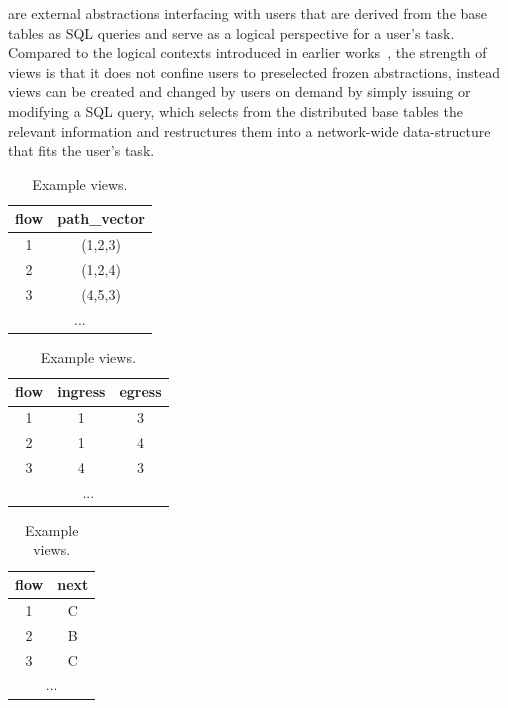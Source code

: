  are external
abstractions interfacing with users that are derived from the base tables as SQL
queries and serve as a logical perspective for a user's task. Compared to the
logical contexts introduced in earlier
works~\cite{ethane-sigcomm07,virtual-forwarding-plane}, the strength
of \Sys views is that it does not confine users to preselected
frozen abstractions, instead \Sys views can be created and changed by
users on demand by simply issuing or modifying a SQL query,
which selects from the distributed base tables the relevant
information and restructures them into a network-wide data-structure
that fits the user's task.

\begin{table}[ht!]
  \centering
\begin{subtable}[t]{0.3\linewidth}
    \centering
  {\footnotesize
      \begin{tabular}[t]{c|c}
        flow & path\_vector \\
        \hline
        1 & (1,2,3) \\
        2 & (1,2,4) \\
        3 & (4,5,3) \\
        \multicolumn{2}{c}{...}
        \label{tb:routing} 
    \end{tabular}
    }
  \end{subtable}
  \;
  \begin{subtable}[t]{0.33\linewidth}
    \centering
  {\footnotesize
    \begin{tabular}[t]{c|c|c}
      flow & ingress & egress \\
      \hline
      1 & 1 & 3 \\
      2 & 1 & 4 \\
      3 & 4 & 3 \\
      \multicolumn{3}{c}{...}
      \label{tb:endpoint}
    \end{tabular}
    }
  \end{subtable}
  \;
  \begin{subtable}[t]{0.3\linewidth}
    \centering
  {\footnotesize
    \begin{tabular}[t]{c|c}
        flow & next \\
        \hline
        1 &  C  \\
        2 & B \\
        3 & C \\
        \multicolumn{2}{c}{...}
        \label{tb:rule-capacity}
      \end{tabular}
    }
  \end{subtable}        
  \caption{\footnotesize Example views.}
\label{table:eg-views}
\end{table}

